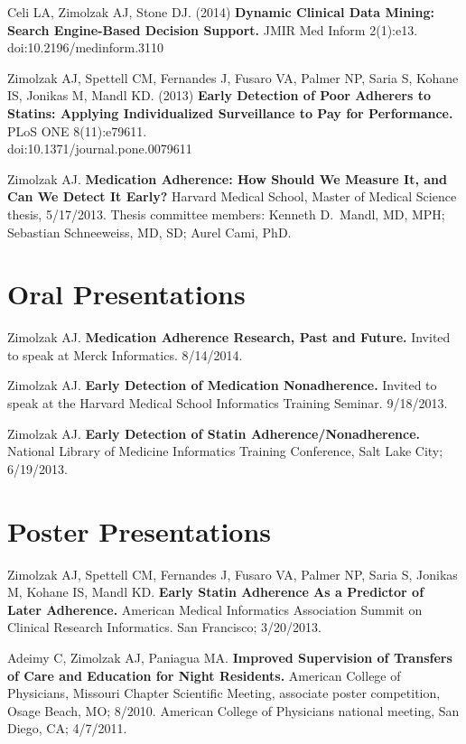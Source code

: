 \documentclass[12pt]{article}
\begin{document}
Celi LA, Zimolzak AJ, Stone DJ. (2014) \textbf{Dynamic Clinical Data
  Mining: Search Engine-Based Decision Support.} JMIR Med Inform
2(1):e13.\\
doi:10.2196/medinform.3110

Zimolzak AJ, Spettell CM, Fernandes J, Fusaro VA, Palmer NP, Saria S,
Kohane IS, Jonikas M, Mandl KD. (2013) \textbf{Early Detection of Poor
  Adherers to Statins: Applying Individualized Surveillance to Pay for
  Performance.} PLoS ONE 8(11):e79611. \\
doi:10.1371/journal.pone.0079611

Zimolzak AJ. \textbf{Medication Adherence: How Should We Measure It, and Can
We Detect It Early?} Harvard Medical School, Master of Medical Science
thesis, 5/17/2013. Thesis committee members: Kenneth D.\ Mandl, MD,
MPH; Sebastian Schneeweiss, MD, SD; Aurel Cami, PhD.

\section*{Oral Presentations}

Zimolzak AJ. \textbf{Medication Adherence Research, Past and Future.}
Invited to speak at Merck Informatics. 8/14/2014.

Zimolzak AJ. \textbf{Early Detection of Medication Nonadherence.}
Invited to speak at the Harvard Medical School Informatics Training
Seminar. 9/18/2013.

Zimolzak AJ. \textbf{Early Detection of Statin
  Adherence/Nonadherence.} National Library of Medicine Informatics
Training Conference, Salt Lake City; 6/19/2013.

\section*{Poster Presentations}

Zimolzak AJ, Spettell CM, Fernandes J, Fusaro VA, Palmer NP, Saria S,
Jonikas M, Kohane IS, Mandl KD. \textbf{Early Statin
  Adherence As a Predictor of Later Adherence.} American Medical
Informatics Association Summit on Clinical Research Informatics. San
Francisco; 3/20/2013.

Adeimy C, Zimolzak AJ, Paniagua MA. \textbf{Improved Supervision of
  Transfers of Care and Education for Night Residents.} American
College of Physicians, Missouri Chapter Scientific Meeting, associate
poster competition, Osage Beach, MO; 8/2010. American College of
Physicians national meeting, San Diego, CA; 4/7/2011.
\end{document}
